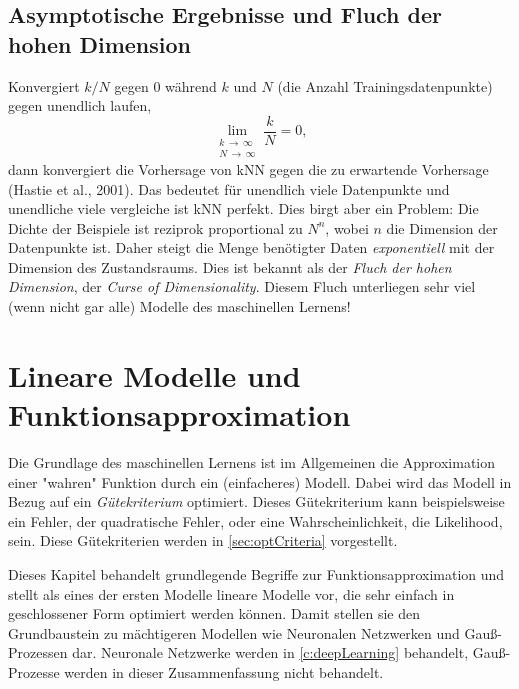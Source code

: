 	\section{Asymptotische Ergebnisse und Fluch der hohen Dimension}
		Konvergiert \( k/N \) gegen \(0\) während \(k\) und \(N\) (die Anzahl Trainingsdatenpunkte) gegen unendlich laufen, \dh
		\begin{equation}
			\lim\limits_{\substack{k \,\to\, \infty \\ N \,\to\, \infty}} \frac{k}{N} = 0,
		\end{equation}
		dann konvergiert die Vorhersage von kNN gegen die zu erwartende Vorhersage (Hastie et al., 2001). Das bedeutet für unendlich viele Datenpunkte und unendliche viele vergleiche ist kNN perfekt. Dies birgt aber ein Problem: Die Dichte der Beispiele ist reziprok proportional zu \( N^n \), wobei \(n\) die Dimension der Datenpunkte ist. Daher steigt die Menge benötigter Daten \emph{exponentiell} mit der Dimension des Zustandsraums. Dies ist bekannt als der \emph{Fluch der hohen Dimension}, der \emph{Curse of Dimensionality}. Diesem Fluch unterliegen sehr viel (wenn nicht gar alle) Modelle des maschinellen Lernens!

\chapter{Lineare Modelle und Funktionsapproximation}
	Die Grundlage des maschinellen Lernens ist im Allgemeinen die Approximation einer "wahren" Funktion durch ein (einfacheres) Modell. Dabei wird das Modell in Bezug auf ein \emph{Gütekriterium} optimiert. Dieses Gütekriterium kann beispielsweise ein Fehler, \zB der quadratische Fehler, oder eine Wahrscheinlichkeit, \zB die Likelihood, sein. Diese Gütekriterien werden in \autoref{sec:optCriteria} vorgestellt.

	Dieses Kapitel behandelt grundlegende Begriffe zur Funktionsapproximation und stellt als eines der ersten Modelle lineare Modelle vor, die sehr einfach in geschlossener Form optimiert werden können. Damit stellen sie den Grundbaustein zu mächtigeren Modellen wie Neuronalen Netzwerken und Gauß-Prozessen dar. Neuronale Netzwerke werden in \autoref{c:deepLearning} behandelt, Gauß-Prozesse werden in dieser Zusammenfassung nicht behandelt.


